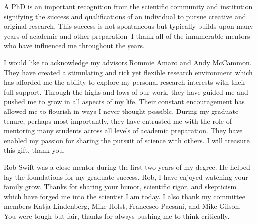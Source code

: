\begin{frontmatter}
%


%
\tableofcontents

\listoffigures  %
\listoftables   %


%
%
\begin{acknowledgements}
\par A PhD is an important recognition from the scientific community and institution signifying the success and qualifications of an individual to pursue creative and original research.
This success is not spontaneous but typically builds upon many years of academic and other preparation.
I thank all of the innumerable mentors who have influenced me throughout the years.

\par I would like to acknowledge my advisors Rommie Amaro and Andy McCammon.
They have created a stimulating and rich yet flexible research environment which has afforded me the ability to explore my personal research interests with their full support.
Through the highs and lows of our work, they have guided me and pushed me to grow in all aspects of my life.
Their constant encouragement has allowed me to flourish in ways I never thought possible.
During my graduate tenure, perhaps most importantly, they have entrusted me with the role of mentoring many students across all levels of academic preparation.
They have enabled my passion for sharing the pursuit of science with others.
I will treasure this gift, thank you.

\par Rob Swift was a close mentor during the first two years of my degree.
He helped lay the foundations for my graduate success.
Rob, I have enjoyed watching your family grow.
Thanks for sharing your humor, scientific rigor, and skepticism which have forged me into the scientist I am today.
I also thank my committee members Katja Lindenberg, Mike Holst, Francesco Paesani, and Mike Gilson.
You were tough but fair, thanks for always pushing me to think critically.


\end{acknowledgements}
\end{frontmatter}
